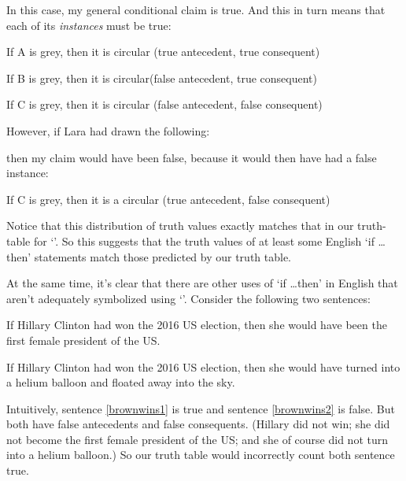 \begin{center}
\end{center}
In this case, my general conditional claim is true.  And this in turn means that each of its \emph{instances} must be true:
	\begin{ebullet}
		\item If A is grey, then it is circular \hfill (true antecedent, true consequent)
		\item If B is grey, then it is circular\hfill (false antecedent, true consequent)
		\item If C is grey, then it is circular \hfill (false antecedent, false consequent)
	\end{ebullet}
However, if Lara had drawn the following:
\begin{center}
\end{center}
then my claim would have been false, because it would then have had a false instance:
	\begin{ebullet}
		\item If C is grey, then it is a circular \hfill (true antecedent, false consequent)
	\end{ebullet}
Notice that this distribution of truth values exactly matches that in our truth-table for `\eif'. So this suggests that the truth values of at least some English `if \ldots then' statements match those predicted by our truth table.

At the same time, it's clear that there are other uses of `if \ldots then' in English that aren't adequately symbolized using `\eif'.  Consider the following two sentences:
	\begin{earg}
		\item[\ex{brownwins1}] If Hillary Clinton had won the 2016 US election, then she would have been the first female president of the US.
		\item[\ex{brownwins2}] If Hillary Clinton had won the 2016 US election, then she would have turned into a helium balloon and floated away into the sky.
	\end{earg}
Intuitively, sentence \ref{brownwins1} is true and sentence \ref{brownwins2} is false. But both have false antecedents and false consequents. (Hillary did not win; she did not become the first female president of the US; and she of course did not turn into a helium balloon.)  So our truth table would incorrectly count both sentence true.


